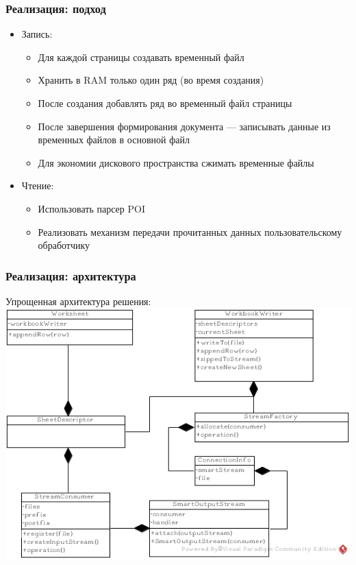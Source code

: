 \documentclass{beamer}
\begin{document}
\begin{frame}\frametitle{Реализация: подход}
\begin{itemize}
    \item Запись:
    \begin{itemize}
        \item Для каждой страницы создавать временный файл
        \item Хранить в RAM только один ряд (во время создания)
        \item После создания добавлять ряд во временный файл страницы
        \item После завершения формирования документа --- записывать данные из временных файлов в основной файл
        \item Для экономии дискового пространства сжимать временные файлы
    \end{itemize}
    \item Чтение:
    \begin{itemize}
        \item Использовать парсер POI
        \item Реализовать механизм передачи прочитанных данных пользовательскому обработчику
    \end{itemize}
\end{itemize}
\end{frame}

\begin{frame}
  \transwipe[direction=90]
  \frametitle{Реализация: архитектура}
  Упрощенная архитектура решения:
  \includegraphics[width=\textwidth,height=\textheight,keepaspectratio]{archi.png}
\end{frame}
\end{document}
